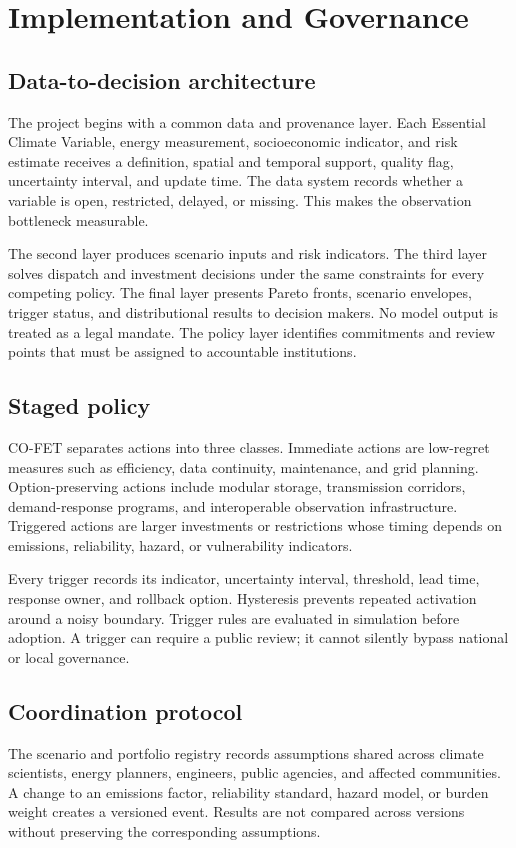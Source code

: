 \documentclass[conference]{IEEEtran}
\begin{document}
\section{Implementation and Governance}
\subsection{Data-to-decision architecture}
The project begins with a common data and provenance layer. Each Essential Climate Variable, energy measurement, socioeconomic indicator, and risk estimate receives a definition, spatial and temporal support, quality flag, uncertainty interval, and update time. The data system records whether a variable is open, restricted, delayed, or missing. This makes the observation bottleneck measurable.

The second layer produces scenario inputs and risk indicators. The third layer solves dispatch and investment decisions under the same constraints for every competing policy. The final layer presents Pareto fronts, scenario envelopes, trigger status, and distributional results to decision makers. No model output is treated as a legal mandate. The policy layer identifies commitments and review points that must be assigned to accountable institutions.

\subsection{Staged policy}
CO-FET separates actions into three classes. Immediate actions are low-regret measures such as efficiency, data continuity, maintenance, and grid planning. Option-preserving actions include modular storage, transmission corridors, demand-response programs, and interoperable observation infrastructure. Triggered actions are larger investments or restrictions whose timing depends on emissions, reliability, hazard, or vulnerability indicators.

Every trigger records its indicator, uncertainty interval, threshold, lead time, response owner, and rollback option. Hysteresis prevents repeated activation around a noisy boundary. Trigger rules are evaluated in simulation before adoption. A trigger can require a public review; it cannot silently bypass national or local governance.

\subsection{Coordination protocol}
The scenario and portfolio registry records assumptions shared across climate scientists, energy planners, engineers, public agencies, and affected communities. A change to an emissions factor, reliability standard, hazard model, or burden weight creates a versioned event. Results are not compared across versions without preserving the corresponding assumptions.
\end{document}
